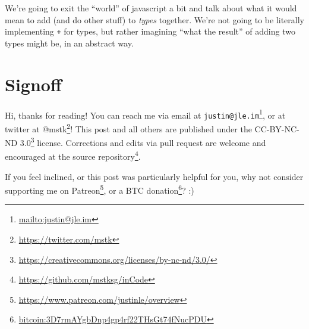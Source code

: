 \documentclass[]{article}
\renewcommand{\href}[2]{#2\footnote{\url{#1}}}
\begin{document}
We're going to exit the ``world'' of javascript a bit and talk about what it
would mean to add (and do other stuff) to \emph{types} together. We're not going
to be literally implementing \texttt{+} for types, but rather imagining ``what
the result'' of adding two types might be, in an abstract way.

\hypertarget{signoff}{%
\section{Signoff}\label{signoff}}

Hi, thanks for reading! You can reach me via email at
\href{mailto:justin@jle.im}{\nolinkurl{justin@jle.im}}, or at twitter at
\href{https://twitter.com/mstk}{@mstk}! This post and all others are published
under the \href{https://creativecommons.org/licenses/by-nc-nd/3.0/}{CC-BY-NC-ND
3.0} license. Corrections and edits via pull request are welcome and encouraged
at \href{https://github.com/mstksg/inCode}{the source repository}.

If you feel inclined, or this post was particularly helpful for you, why not
consider \href{https://www.patreon.com/justinle/overview}{supporting me on
Patreon}, or a \href{bitcoin:3D7rmAYgbDnp4gp4rf22THsGt74fNucPDU}{BTC donation}?
:)
\end{document}
